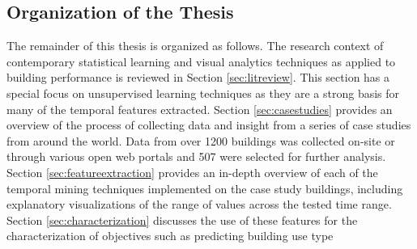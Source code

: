 \subsection{Organization of the Thesis}
\label{sec:organization}

The remainder of this thesis is organized as follows. The research context of contemporary statistical learning and visual analytics techniques as applied to building performance is reviewed in Section \ref{sec:litreview}. This section has a special focus on unsupervised learning techniques as they are a strong basis for many of the temporal features extracted. Section \ref{sec:casestudies} provides an overview of the process of collecting data and insight from a series of case studies from around the world. Data from over 1200 buildings was collected on-site or through various open web portals and 507 were selected for further analysis. Section \ref{sec:featureextraction} provides an in-depth overview of each of the temporal mining techniques implemented on the case study buildings, including explanatory visualizations of the range of values across the tested time range. Section \ref{sec:characterization} discusses the use of these features for the characterization of objectives such as predicting building use type
